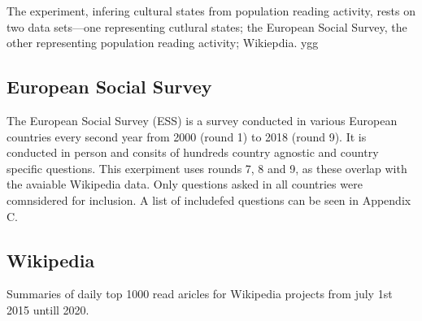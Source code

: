 The experiment, infering cultural states from population reading activity, rests on two data sets—one representing cutlural states; the European Social Survey, the other representing population reading activity; Wikiepdia.
ygg


\subsection*{European Social Survey}
The European Social Survey (ESS) is a survey conducted in various European countries every second year from 2000 (round 1) to 2018 (round 9). It is conducted in person and consits of hundreds country agnostic and country specific questions. This exerpiment uses rounds 7, 8 and 9, as these overlap with the avaiable Wikipedia data.
Only questions asked in all countries were comnsidered for inclusion. A list of includefed questions can be seen in Appendix C.

\subsection*{Wikipedia}
Summaries of daily top 1000 read aricles for Wikipedia projects from july 1st 2015 untill 2020.

